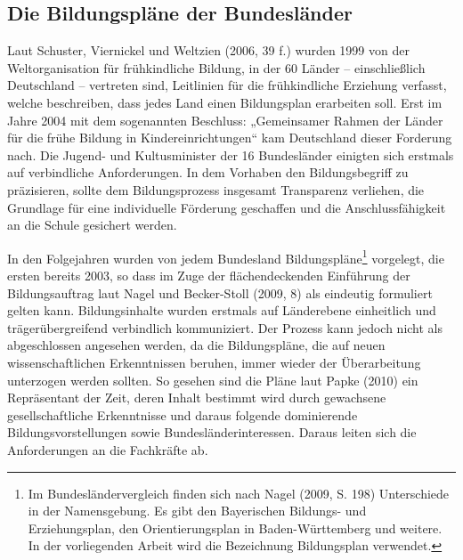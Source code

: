 \subsection{Die Bildungspläne der Bundesländer}
Laut Schuster, Viernickel und Weltzien (2006, 39 f.) wurden 1999 von der Weltorganisation für frühkindliche Bildung, in der 60 Länder -- einschließlich Deutschland -- vertreten sind, Leitlinien für die frühkindliche Erziehung verfasst, welche beschreiben, dass jedes Land einen Bildungsplan erarbeiten soll. Erst im Jahre 2004 mit dem sogenannten Beschluss: „Gemeinsamer Rahmen der Länder für die frühe Bildung in Kindereinrichtungen“ kam Deutschland dieser Forderung nach. Die Jugend- und Kultusminister der 16 Bundesländer einigten sich erstmals auf verbindliche Anforderungen. In dem Vorhaben den Bildungsbegriff zu präzisieren, sollte dem Bildungsprozess insgesamt Transparenz verliehen, die Grundlage für eine individuelle Förderung geschaffen und die Anschlussfähigkeit an die Schule gesichert werden. 

In den Folgejahren wurden von jedem Bundesland Bildungspläne\footnote{Im Bundesländervergleich finden sich nach Nagel (2009, S. 198) Unterschiede in der Namensgebung. Es gibt den Bayerischen Bildungs- und Erziehungsplan, den Orientierungsplan in Baden-Württemberg und weitere. In der vorliegenden Arbeit wird die Bezeichnung Bildungsplan verwendet.} vorgelegt, die ersten bereits 2003, so dass im Zuge der flächendeckenden Einführung der Bildungsauftrag laut Nagel und Becker-Stoll (2009, 8) als eindeutig formuliert gelten kann. Bildungsinhalte wurden erstmals auf Länderebene einheitlich und trägerübergreifend verbindlich kommuniziert. Der Prozess kann jedoch nicht als abgeschlossen angesehen werden, da die Bildungspläne, die auf neuen wissenschaftlichen Erkenntnissen beruhen, immer wieder der Überarbeitung unterzogen werden sollten. So gesehen sind die Pläne laut Papke (2010) ein Repräsentant der Zeit, deren Inhalt bestimmt wird durch gewachsene gesellschaftliche Erkenntnisse und daraus folgende dominierende Bildungsvorstellungen sowie Bundesländerinteressen. Daraus leiten sich die Anforderungen an die Fachkräfte ab. 

